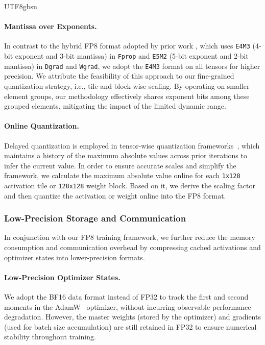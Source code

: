 \documentclass[11pt, a4paper, logo, copyright, nonumbering]{deepseek}
\begin{document}
\begin{CJK*}{UTF8}{gbsn}
\paragraph{Mantissa over Exponents.} 
In contrast to the hybrid FP8 format adopted by prior work \citep{transformerengine, fp8lm, hfp8}, which uses \texttt{E4M3} (4-bit exponent and 3-bit mantissa) in \texttt{Fprop} and \texttt{E5M2} (5-bit exponent and 2-bit mantissa) in \texttt{Dgrad} and \texttt{Wgrad}, we adopt the \texttt{E4M3} format on all tensors for higher precision. 
We attribute the feasibility of this approach to our fine-grained quantization strategy, i.e., tile and block-wise scaling. 
By operating on smaller element groups, our methodology effectively shares exponent bits among these grouped elements, mitigating the impact of the limited dynamic range. 

\paragraph{Online Quantization.}
Delayed quantization is employed in tensor-wise quantization frameworks~\citep{transformerengine, fp8lm}, which maintains a history of the maximum absolute values across prior iterations to infer the current value. 
In order to ensure accurate scales and simplify the framework, we calculate the maximum absolute value online for each \texttt{1x128} activation tile or \texttt{128x128} weight block. 
Based on it, we derive the scaling factor and then quantize the activation or weight online into the FP8 format.

\subsubsection{Low-Precision Storage and Communication}
In conjunction with our FP8 training framework, we further reduce the memory consumption and communication overhead by compressing cached activations and optimizer states into lower-precision formats.

\paragraph{Low-Precision Optimizer States.}
We adopt the BF16 data format instead of FP32 to track the first and second moments in the AdamW~\citep{adamW} optimizer, without incurring observable performance degradation. 
However, the master weights (stored by the optimizer) and gradients (used for batch size accumulation) are still retained in FP32 to ensure numerical stability throughout training.


\end{CJK*}
\end{document}
